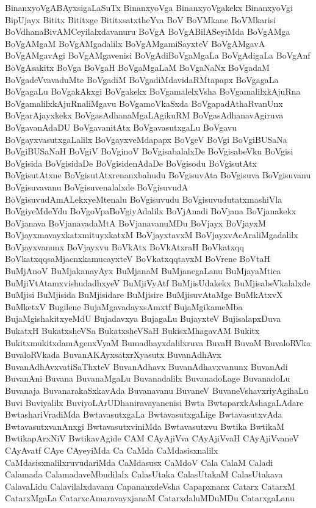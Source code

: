 {BinanxyoVgABAyxsigaLaSuTx
BinanxyoVga
BinanxyoVgakekx
BinanxyoVgi
BipUjayx
Bititx
Bititxge
BititxsatxtheYva
BoV
BoVMkane
BoVMkarisi
BoVdhanaBivAMCeyilalxdavanuru
BoVgA
BoVgABilASeyiMda
BoVgAMga
BoVgAMgaM
BoVgAMgadalilx
BoVgAMgamiSayxteV
BoVgAMgavA
BoVgAMgavAgi
BoVgAMgavenisi
BoVgAdiBoVgaMgaLa
BoVgAdigaLa
BoVgAnf
BoVgAsakitx
BoVga
BoVgaH
BoVgaMgaLaM
BoVgaNaNx
BoVgadaM
BoVgadeVvavaduMte
BoVgadiM
BoVgadiMdavidaRMtapapx
BoVgagaLa
BoVgagaLu
BoVgakAkxgi
BoVgakekx
BoVgamalelxVsha
BoVgamalilxkAjuRna
BoVgamalilxkAjuRnaliMgavu
BoVgamoVkaSxda
BoVgapadAthaRvanUnx
BoVgarAjayxkekx
BoVgasAdhanaMgaLAgikuRM
BoVgasAdhanavAgiruva
BoVgavanAdaDU
BoVgavanitAtx
BoVgavasutxgaLu
BoVgavu
BoVgayxvasutxgaLalilx
BoVgayxveMdapapx
BoVgeV
BoVgi
BoVgiBUSaNa
BoVgiBUSaNaH
BoVgiV
BoVginoV
BoVgisabalalxDe
BoVgisabeVku
BoVgisi
BoVgisida
BoVgisidaDe
BoVgisidenAdaDe
BoVgisodu
BoVgisutAtx
BoVgisutAtxne
BoVgisutAtxrenanxbahudu
BoVgisuvAta
BoVgisuva
BoVgisuvanu
BoVgisuvavanu
BoVgisuvenalalxde
BoVgisuvudA
BoVgisuvudAmALekxyeMtenalu
BoVgisuvudu
BoVgisuvudutatxmashiVla
BoVgiyeMdeYdu
BoVgoVpaBoVgiyAdalilx
BoVjAnadi
BoVjana
BoVjanakekx
BoVjanava
BoVjanavadaMtA
BoVjanavanuMDu
BoVjayx
BoVjayxM
BoVjayxmavayxkatxmituyxkatxM
BoVjayxtavxM
BoVjayxvAcAraliMgadalilx
BoVjayxvanunx
BoVjayxvu
BoVkAtx
BoVkAtxraH
BoVkatxqq
BoVkatxqqsaMjacnxkamucayxteV
BoVkatxqqtavxM
BoVrene
BoVtaH
BuMjAnoV
BuMjakanayAyx
BuMjanaM
BuMjanegaLanu
BuMjayaMtica
BuMjiVtAtamxvishudadhxyeV
BuMjiVyAtf
BuMjisUdakekx
BuMjisabeVkalalxde
BuMjisi
BuMjisida
BuMjisidare
BuMjisire
BuMjisuvAtaMge
BuMkAtxvX
BuMketxV
Bugilene
BujaMgavadayxsAmxtf
BujaMgikameMba
BujaMgishakitxyeMdU
Bujadavxya
BujagaLu
BujayxteV
BujisalapxDuva
BukatxH
BukatxsheVSa
BukatxsheVSaH
BukisxMhagavAM
Bukitx
BukitxmukitxdamAgenxVyaM
Bumadhayxdalilxruva
BuvaH
BuvaM
BuvaloRVka
BuvaloRVkada
BuvanAKAyxsatxrXyasutx
BuvanAdhAvx
BuvanAdhAvxvatiSaThxteV
BuvanAdhavx
BuvanAdhavxvanunx
BuvanAdi
BuvanAni
Buvana
BuvanaMgaLu
Buvanadalilx
BuvanadoLage
BuvanadoLu
Buvanaja
BuvanarakaSxkavAda
Buvanavanu
BuvaneV
BuvaneVshavxriyAgihaLu
Buvi
Buviyalilx
BuviyoLArUDhaniravayanenisi
Bwta
BwtaparxkAshagaLAdare
BwtashariVradiMda
BwtavasutxgaLa
BwtavasutxgaLige
BwtavasutxvAda
BwtavasutxvanAnxgi
BwtavasutxviniMda
Bwtavasutxvu
Bwtika
BwtikaM
BwtikapArxNiV
BwtikavAgide
CAM
CAyAjiVva
CAyAjiVvaH
CAyAjiVvaneV
CAyAvatf
CAye
CAyeyiMda
Ca
CaMda
CaMdasisxnalilx
CaMdasisxnalilxruvudariMda
CaMdasusx
CaMdoV
Cala
CalaM
Caladi
Calamada
CalamadaveMbudilalx
CalasUtaka
CalasUtakaM
CalasUtakava
CalavaLidu
Calavilalxdavanu
CapananxdeVsha
Capapxnanx
Catarx
CatarxM
CatarxMgaLa
CatarxcAmaravayxjanaM
CatarxdaluMDuMDu
CatarxgaLanu
}
